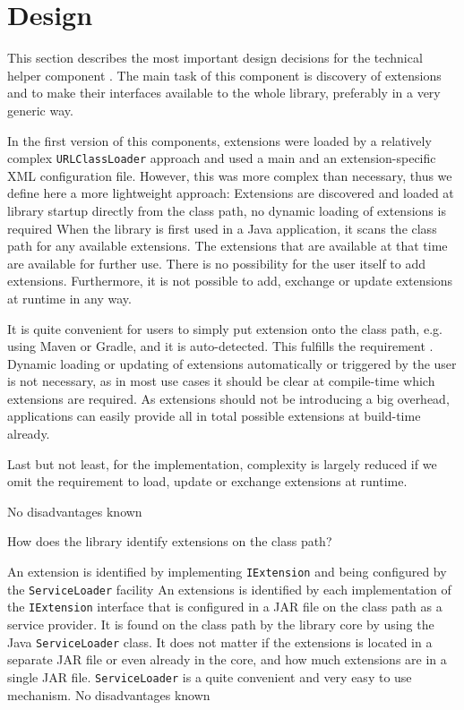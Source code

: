 \section{\COMPextensionManagement{} Design}
\label{sec:COMPextensionManagementDesign}

This section describes the most important design decisions for the technical helper component \COMPextensionManagement{}. The main task of this component is discovery of extensions and to make their interfaces available to the whole library, preferably in a very generic way.

In the first version of this components, extensions were loaded by a relatively complex \texttt{URLClassLoader} approach and used a main and an extension-specific XML configuration file. However, this was more complex than necessary, thus we define here a more lightweight approach:
{%
Extensions are discovered and loaded at library startup directly from the class path, no dynamic loading of extensions is required
}
{%
When the library is first used in a Java application, it scans the class path for any available extensions. The extensions that are available at that time are available for further use. There is no possibility for the user itself to add extensions. Furthermore, it is not possible to add, exchange or update extensions at runtime in any way.
}
{%
It is quite convenient for users to simply put extension onto the class path, e.g. using Maven or Gradle, and it is auto-detected. This fulfills the requirement . Dynamic loading or updating of extensions automatically or triggered by the \LibName{} user is not necessary, as in most use cases it should be clear at compile-time which extensions are required. As extensions should not be introducing a big overhead, applications can easily provide all in total possible extensions at build-time already.

Last but not least, for the \LibName{} implementation, complexity is largely reduced if we omit the requirement to load, update or exchange extensions at runtime.
}
{%
No disadvantages known
}

How does the library identify extensions on the class path?

{%
An extension is identified by implementing \texttt{IExtension} and being configured by the \texttt{ServiceLoader} facility
}
{%
An extensions is identified by each implementation of the \texttt{IExtension} interface that is configured in a JAR file on the class path as a service provider. It is found on the class path by the library core by using the Java \texttt{ServiceLoader} class. It does not matter if the extensions is located in a separate JAR file or even already in the core, and how much extensions are in a single JAR file.
}
{%
\texttt{ServiceLoader} is a quite convenient and very easy to use mechanism.
}
{%
No disadvantages known
}

